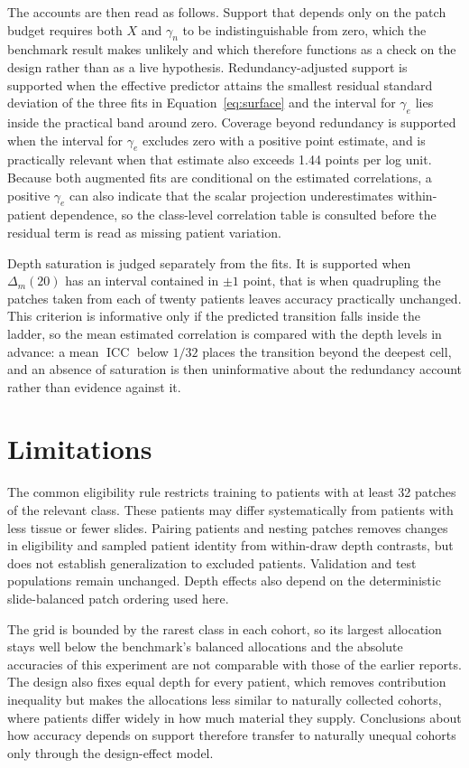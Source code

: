 \documentclass[11pt]{article}
\newcommand{\ICC}{\operatorname{ICC}}
\begin{document}
The accounts are then read as follows. Support that depends only on the patch budget requires both $X$ and $\gamma_n$ to be indistinguishable from zero, which the benchmark result makes unlikely and which therefore functions as a check on the design rather than as a live hypothesis. Redundancy-adjusted support is supported when the effective predictor attains the smallest residual standard deviation of the three fits in Equation~\eqref{eq:surface} and the interval for $\gamma_e$ lies inside the practical band around zero. Coverage beyond redundancy is supported when the interval for $\gamma_e$ excludes zero with a positive point estimate, and is practically relevant when that estimate also exceeds 1.44 points per log unit. Because both augmented fits are conditional on the estimated correlations, a positive $\gamma_e$ can also indicate that the scalar projection underestimates within-patient dependence, so the class-level correlation table is consulted before the residual term is read as missing patient variation.

Depth saturation is judged separately from the fits. It is supported when $\Delta_m(20)$ has an interval contained in $\pm1$ point, that is when quadrupling the patches taken from each of twenty patients leaves accuracy practically unchanged. This criterion is informative only if the predicted transition falls inside the ladder, so the mean estimated correlation is compared with the depth levels in advance: a mean $\ICC$ below $1/32$ places the transition beyond the deepest cell, and an absence of saturation is then uninformative about the redundancy account rather than evidence against it.



\clearpage
\section{Limitations}
\label{sec:limitations}
The common eligibility rule restricts training to patients with at least 32 patches of the relevant class. These patients may differ systematically from patients with less tissue or fewer slides. Pairing patients and nesting patches removes changes in eligibility and sampled patient identity from within-draw depth contrasts, but does not establish generalization to excluded patients. Validation and test populations remain unchanged. Depth effects also depend on the deterministic slide-balanced patch ordering used here.

The grid is bounded by the rarest class in each cohort, so its largest allocation stays well below the benchmark's balanced allocations and the absolute accuracies of this experiment are not comparable with those of the earlier reports. The design also fixes equal depth for every patient, which removes contribution inequality but makes the allocations less similar to naturally collected cohorts, where patients differ widely in how much material they supply. Conclusions about how accuracy depends on support therefore transfer to naturally unequal cohorts only through the design-effect model.
\end{document}
